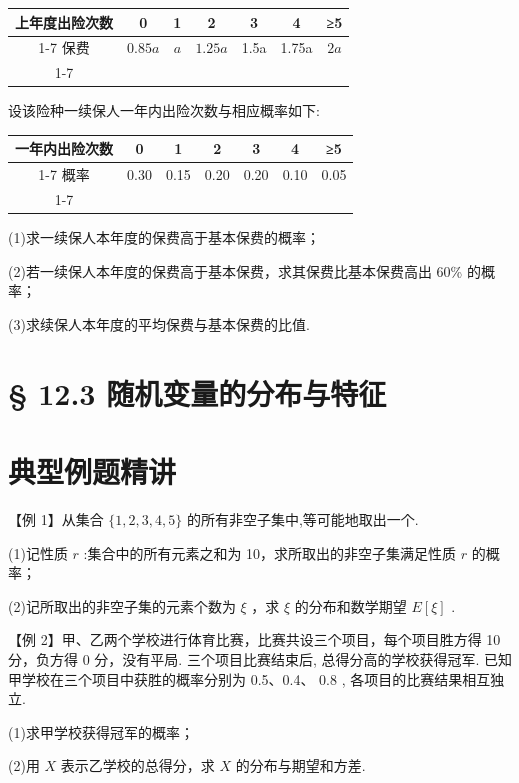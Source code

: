 \begin{center}
\begin{tabular}{|c|c|c|c|c|c|c|}
\hline
上年度出险次数 & 0 & 1 & 2 & 3 & 4 & ≥5 \\
\cline{1-7}
保费 & ${0.85a}$ & $a$ & ${1.25a}$ & 1.5a & 1.75a & ${2a}$ \\
\cline{1-7}
\hline
\end{tabular}
\end{center}

设该险种一续保人一年内出险次数与相应概率如下:

\begin{center}
\begin{tabular}{|c|c|c|c|c|c|c|}
\hline
一年内出险次数 & 0 & 1 & 2 & 3 & 4 & ≥5 \\
\cline{1-7}
概率 & 0.30 & 0.15 & 0.20 & 0.20 & 0.10 & 0.05 \\
\cline{1-7}
\hline
\end{tabular}
\end{center}

(1)求一续保人本年度的保费高于基本保费的概率；

(2)若一续保人本年度的保费高于基本保费，求其保费比基本保费高出 60\% 的概率；

(3)求续保人本年度的平均保费与基本保费的比值.

\section*{§ 12.3 随机变量的分布与特征}

\section*{典型例题精讲}

【例 1】从集合 $\{ 1,2,3,4,5\}$ 的所有非空子集中,等可能地取出一个.

(1)记性质 $r$ :集合中的所有元素之和为 10，求所取出的非空子集满足性质 $r$ 的概率；

(2)记所取出的非空子集的元素个数为 $\xi$ ，求 $\xi$ 的分布和数学期望 $E\left\lbrack  \xi \right\rbrack$ .

【例 2】甲、乙两个学校进行体育比赛，比赛共设三个项目，每个项目胜方得 10 分，负方得 0 分，没有平局. 三个项目比赛结束后, 总得分高的学校获得冠军. 已知甲学校在三个项目中获胜的概率分别为 0.5、0.4、 0.8 , 各项目的比赛结果相互独立.

(1)求甲学校获得冠军的概率；

(2)用 $X$ 表示乙学校的总得分，求 $X$ 的分布与期望和方差.

